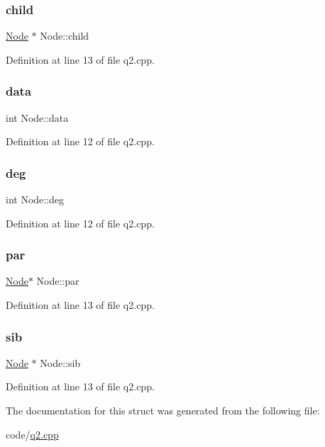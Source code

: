 \subsubsection{\texorpdfstring{child}{child}}
{\footnotesize\ttfamily \hyperlink{struct_node}{Node} $\ast$ Node\+::child}



Definition at line 13 of file q2.\+cpp.

\mbox{\label{struct_node_a87c003c9f600e3fc58e6e90835f0b605}} 
\subsubsection{\texorpdfstring{data}{data}}
{\footnotesize\ttfamily int Node\+::data}



Definition at line 12 of file q2.\+cpp.

\mbox{\label{struct_node_a7e62acb60050120d8d3d5b8fb640bbcb}} 
\subsubsection{\texorpdfstring{deg}{deg}}
{\footnotesize\ttfamily int Node\+::deg}



Definition at line 12 of file q2.\+cpp.

\mbox{\label{struct_node_abc9a07a65bab86d77438b34e607ba148}} 
\subsubsection{\texorpdfstring{par}{par}}
{\footnotesize\ttfamily \hyperlink{struct_node}{Node}$\ast$ Node\+::par}



Definition at line 13 of file q2.\+cpp.

\mbox{\label{struct_node_a2df7d905421f931a2b076706e7daed1b}} 
\subsubsection{\texorpdfstring{sib}{sib}}
{\footnotesize\ttfamily \hyperlink{struct_node}{Node} $\ast$ Node\+::sib}



Definition at line 13 of file q2.\+cpp.



The documentation for this struct was generated from the following file\+:\begin{DoxyCompactItemize}
\item 
code/\hyperlink{q2_8cpp}{q2.\+cpp}\end{DoxyCompactItemize}
